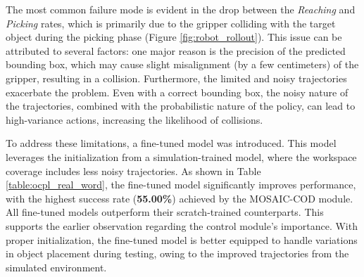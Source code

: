 The most common failure mode is evident in the drop between the \textit{Reaching} and \textit{Picking} rates, which is primarily due to the gripper colliding with the target object during the picking phase (Figure \ref{fig:robot_rollout}). This issue can be attributed to several factors: one major reason is the precision of the predicted bounding box, which may cause slight misalignment (by a few centimeters) of the gripper, resulting in a collision. Furthermore, the limited and noisy trajectories exacerbate the problem. Even with a correct bounding box, the noisy nature of the trajectories, combined with the probabilistic nature of the policy, can lead to high-variance actions, increasing the likelihood of collisions.


To address these limitations, a fine-tuned model was introduced. This model leverages the initialization from a simulation-trained model, where the workspace coverage includes less noisy trajectories. As shown in Table \ref{table:ocpl_real_word}, the fine-tuned model significantly improves performance, with the highest success rate (\textbf{55.00\%}) achieved by the MOSAIC-COD module. All fine-tuned models outperform their scratch-trained counterparts. This supports the earlier observation regarding the control module's importance. With proper initialization, the fine-tuned model is better equipped to handle variations in object placement during testing, owing to the improved trajectories from the simulated environment.

